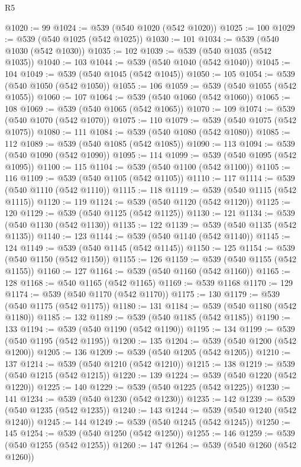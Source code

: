 \begin{lexlean}{R5}
\begin{coremodule}
@1020 := 99
@1024 := @539 (@540 @1020 (@542 @1020))
@1025 := 100
@1029 := @539 (@540 @1025 (@542 @1025))
@1030 := 101
@1034 := @539 (@540 @1030 (@542 @1030))
@1035 := 102
@1039 := @539 (@540 @1035 (@542 @1035))
@1040 := 103
@1044 := @539 (@540 @1040 (@542 @1040))
@1045 := 104
@1049 := @539 (@540 @1045 (@542 @1045))
@1050 := 105
@1054 := @539 (@540 @1050 (@542 @1050))
@1055 := 106
@1059 := @539 (@540 @1055 (@542 @1055))
@1060 := 107
@1064 := @539 (@540 @1060 (@542 @1060))
@1065 := 108
@1069 := @539 (@540 @1065 (@542 @1065))
@1070 := 109
@1074 := @539 (@540 @1070 (@542 @1070))
@1075 := 110
@1079 := @539 (@540 @1075 (@542 @1075))
@1080 := 111
@1084 := @539 (@540 @1080 (@542 @1080))
@1085 := 112
@1089 := @539 (@540 @1085 (@542 @1085))
@1090 := 113
@1094 := @539 (@540 @1090 (@542 @1090))
@1095 := 114
@1099 := @539 (@540 @1095 (@542 @1095))
@1100 := 115
@1104 := @539 (@540 @1100 (@542 @1100))
@1105 := 116
@1109 := @539 (@540 @1105 (@542 @1105))
@1110 := 117
@1114 := @539 (@540 @1110 (@542 @1110))
@1115 := 118
@1119 := @539 (@540 @1115 (@542 @1115))
@1120 := 119
@1124 := @539 (@540 @1120 (@542 @1120))
@1125 := 120
@1129 := @539 (@540 @1125 (@542 @1125))
@1130 := 121
@1134 := @539 (@540 @1130 (@542 @1130))
@1135 := 122
@1139 := @539 (@540 @1135 (@542 @1135))
@1140 := 123
@1144 := @539 (@540 @1140 (@542 @1140))
@1145 := 124
@1149 := @539 (@540 @1145 (@542 @1145))
@1150 := 125
@1154 := @539 (@540 @1150 (@542 @1150))
@1155 := 126
@1159 := @539 (@540 @1155 (@542 @1155))
@1160 := 127
@1164 := @539 (@540 @1160 (@542 @1160))
@1165 := 128
@1168 := @540 @1165 (@542 @1165)
@1169 := @539 @1168
@1170 := 129
@1174 := @539 (@540 @1170 (@542 @1170))
@1175 := 130
@1179 := @539 (@540 @1175 (@542 @1175))
@1180 := 131
@1184 := @539 (@540 @1180 (@542 @1180))
@1185 := 132
@1189 := @539 (@540 @1185 (@542 @1185))
@1190 := 133
@1194 := @539 (@540 @1190 (@542 @1190))
@1195 := 134
@1199 := @539 (@540 @1195 (@542 @1195))
@1200 := 135
@1204 := @539 (@540 @1200 (@542 @1200))
@1205 := 136
@1209 := @539 (@540 @1205 (@542 @1205))
@1210 := 137
@1214 := @539 (@540 @1210 (@542 @1210))
@1215 := 138
@1219 := @539 (@540 @1215 (@542 @1215))
@1220 := 139
@1224 := @539 (@540 @1220 (@542 @1220))
@1225 := 140
@1229 := @539 (@540 @1225 (@542 @1225))
@1230 := 141
@1234 := @539 (@540 @1230 (@542 @1230))
@1235 := 142
@1239 := @539 (@540 @1235 (@542 @1235))
@1240 := 143
@1244 := @539 (@540 @1240 (@542 @1240))
@1245 := 144
@1249 := @539 (@540 @1245 (@542 @1245))
@1250 := 145
@1254 := @539 (@540 @1250 (@542 @1250))
@1255 := 146
@1259 := @539 (@540 @1255 (@542 @1255))
@1260 := 147
@1264 := @539 (@540 @1260 (@542 @1260))

\end{coremodule}
\end{lexlean}
